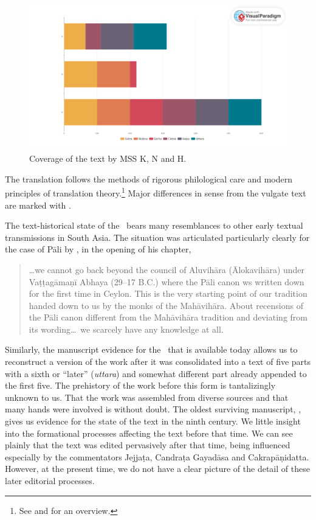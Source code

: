         \begin{figure}[t]
            \centering
            \includegraphics[width=\textwidth]{"media/MSS 1 visual paradigm.art"}
            \caption{Coverage of the text by MSS K, N and H.}
            \label{fig:mss-1-visual-paradigm}
        \end{figure}
        
    
    
The translation follows the methods of rigorous philological care and 
modern principles of translation theory.\footnote{See 
\cite[intro.]{wuja-2003} and \cite[81--83]{wuja-2021} for an overview.}  Major 
differences in sense from the vulgate text are marked with .

The text-historical state of the \SS\ bears many resemblances to other early 
textual transmissions in South Asia.  The situation was articulated particularly 
clearly for the case of Pāli by \citet{hinu-1978}, in the opening of his chapter, 
\begin{quote}
    \ldots we cannot go back beyond the council of Aluvihāra (Ālokavihāra) under 
    Vaṭṭagāmaṇī Abhaya (29--17 B.C.) where the Pāli canon ws written down for 
    the first time in Ceylon.  This is the very starting point of our tradition 
    handed down to us by the monks of the Mahāvihāra.  About recensions of 
    the Pāli canon different from the Mahāvihāra tradition and deviating from its 
    wording\ldots\ we scarcely have any knowledge at all.
\end{quote}
Similarly, the manuscript evidence for the \SS\ that is available today allows us 
to reconstruct a version of the work after it was consolidated into a text of five  
parts with a sixth or “later” (\emph{uttara}) and somewhat different part 
already appended to the first five.  The prehistory of the work before this form 
is tantalizingly unknown to us.  That the work was assembled from diverse 
sources and that many hands were involved is without doubt.  The oldest 
surviving manuscript, , gives us evidence for the state 
of the text in the ninth century.  We little insight into the formational processes 
affecting the text before that time.  We can see plainly that the text was 
edited pervasively after that time, being influenced especially by the 
commentators Jejjaṭa, Candraṭa Gayadāsa and Cakrapāṇidatta. However, at the 
present time, we do not have a clear picture of the detail of these later 
editorial processes.